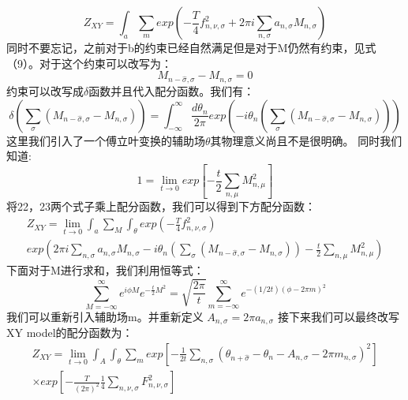 \documentclass{article}
\begin{document}
\begin{equation}
    Z_{XY} = \int_{a} \sum_{m} exp \left( -\frac{T}{4} f_{n,\nu,\sigma}^2 + 2 \pi i \sum_{n,\sigma} a_{n,\sigma} M_{n,\sigma} \right) 
\end{equation}
同时不要忘记，之前对于b的约束已经自然满足但是对于M仍然有约束，见式（9）。对于这个约束可以改写为：
\begin{equation}
    M_{n-\hat \sigma,\sigma} - M_{n,\sigma} = 0
\end{equation}
约束可以改写成$\delta$函数并且代入配分函数。我们有：
\begin{equation}
    \delta \left(  \sum_{\sigma} (M_{n-\hat \sigma,\sigma} - M_{n,\sigma} )\right) = \int_{ - \infty}^{\infty} \frac{ d \theta_n}{2 \pi} exp \left( -i \theta_n \left(\sum_{\sigma} (M_{n-\hat \sigma,\sigma} - M_{n,\sigma} )\right) \right)  
\end{equation}
这里我们引入了一个傅立叶变换的辅助场$\theta$其物理意义尚且不是很明确。
同时我们知道:
\begin{equation}
    1 = \lim_{t \to 0} exp\left[ - \frac{t}{2} \sum_{n,\mu} M_{n,\mu}^2 \right]   
\end{equation}
将22，23两个式子乘上配分函数，我们可以得到下方配分函数：
\begin{equation}
    \begin{split}
        Z_{XY} = \lim_{t \to 0}  \int_{a} \sum_{M} \int_{\theta} exp \left( -\frac{T}{4} f_{n,\nu,\sigma}^2 \right)\\
        exp \left( 2 \pi i \sum_{n,\sigma} a_{n,\sigma} M_{n,\sigma}  -i \theta_n \left(\sum_{\sigma} (M_{n-\hat \sigma,\sigma} - M_{n,\sigma} )\right) - \frac{t}{2} \sum_{n,\mu} M_{n,\mu}^2   \right) 
    \end{split}
\end{equation}
下面对于M进行求和，我们利用恒等式：
\begin{equation}
    \sum_{M = -\infty}^{\infty} e^{i \phi M} e^{-\frac{t}{2}M^2} = \sqrt{\frac{2 \pi}{t}} \sum_{m = -\infty}^{\infty} e^{-(1/2t)(\phi-2\pi m)^2}
\end{equation}
我们可以重新引入辅助场m。并重新定义
$A_{n,\sigma} = 2 \pi a_{n,\sigma}$
接下来我们可以最终改写XY model的配分函数为：
\begin{equation}
   \begin{split}
    Z_{XY} = \lim_{t \to 0}  \int_{A}  \int_{\theta}\sum_{m} exp \left[-\frac{1}{2t} \sum_{n,\sigma} (\theta_{n+ \hat \sigma} - \theta_n - A_{n,\sigma} - 2 \pi m_{n,\sigma})^2 \right]  \\
    \times exp \left[- \frac{T}{\left(2 \pi\right)^2 }  \frac{1}{4} \sum_{n,\nu,\sigma} F_{n,\nu,\sigma}^2 \right]  
   \end{split}
\end{equation}
\end{document}
